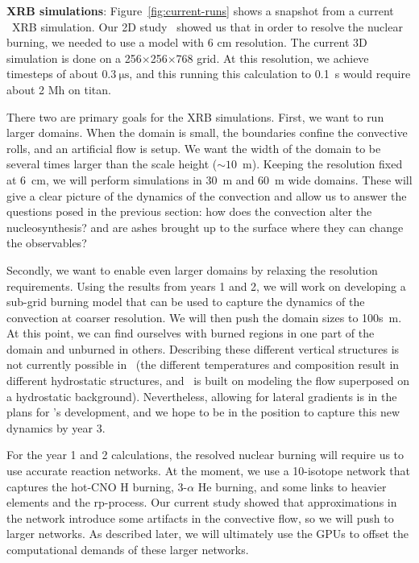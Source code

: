 \documentclass[11pt,letterpaper,english]{article}
\begin{document}
{\bf XRB simulations}:  Figure~\ref{fig:current-runs} shows
a snapshot from a current \maestro\ XRB simulation.
Our
2D study~\cite{XRB2} showed us that in order to resolve the 
nuclear burning, we needed to use a model with 6 cm resolution.
The current 3D simulation is done on a 256$\times$256$\times$768
grid.  At this resolution, we achieve timesteps of about $0.3~\mathrm{\mu s}$,
and this running this calculation to 0.1~s would require about 2 Mh on titan.

There two are primary goals for the XRB simulations.  First, we want to run
larger domains.  When the domain is small, the boundaries confine the convective
rolls, and an artificial flow is setup.  We want the width of the domain to be
several times larger than the scale height ($\sim 10$~m).  Keeping the
resolution fixed at 6~cm, we will perform simulations in 30~m and 60~m wide
domains.  These will give a clear picture of the dynamics of the convection
and allow us to answer the questions posed in the previous section:
how does the convection alter the nucleosynthesis? and are ashes brought
up to the surface where they can change the observables?

Secondly, we want to enable even larger domains by relaxing the
resolution requirements.  Using the results from years 1 and 2, we
will work on developing a sub-grid burning model that can be used to
capture the dynamics of the convection at coarser resolution.  We will
then push the domain sizes to 100s~m.  At this point, we can find ourselves
with burned regions in one part of the domain and unburned in others.  
Describing these different vertical structures is not currently possible
in \maestro\ (the different temperatures and composition result in different
hydrostatic structures, and \maestro\ is built on modeling the flow superposed
on a hydrostatic background).  Nevertheless, allowing for lateral gradients is 
in the plans for \maestro's development, and we hope to be in the position
to capture this new dynamics by year 3.

For the year 1 and 2 calculations, the resolved nuclear burning will require
us to use accurate reaction networks.  At the moment, we use a 10-isotope
network that captures the hot-CNO H burning, 3-$\alpha$ He burning, and some
links to heavier elements and the rp-process.  Our current study showed that
approximations in the network introduce some artifacts in the convective flow,
so we will push to larger networks.  As described later, we will ultimately
use the GPUs to offset the computational demands of these larger networks.
\end{document}
